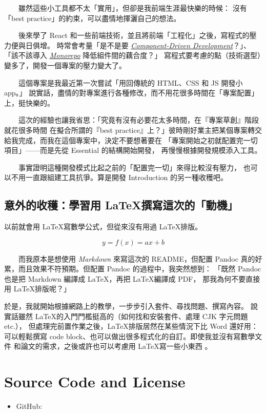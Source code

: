 \documentclass[12pt]{article}
\begin{document}
  　　雖然這些小工具都不太「實用」，但卻是我前端生涯最快樂的時候：
  沒有「best practice」的約束，可以盡情地揮灑自己的想法。

  　　後來學了 React 和一些前端技術，並且將前端「工程化」之後，寫程式的壓力便與日俱增。
  時常會考量「是不是要 \href{https://www.componentdriven.org}{\textit{Component-Driven Development}}？」、
  「該不該導入 \href{https://nx.dev}{\textit{Monorepo}} 降低組件間的藕合度？」
  寫程式要考慮的點（技術選型）變多了，開發一個專案的壓力變大了。

  　　這個專案是我最近第一次嘗試「用回傳統的 HTML、CSS 和 JS 開發小 app。」
  說實話，盡情的對專案進行各種修改，而不用花很多時間在「專案配置」上，挺快樂的。

  　　這次的經驗也讓我省思：「究竟有沒有必要花太多時間，在『專案草創』階段就花很多時間
  在擬合所謂的『best practice』上？」彼時剛好業主把某個專案轉交給我完成，而我在這個專案中，決定不要想著要在
  「專案開始之初就配置完一切項目」——而是先從 Essential 的結構開始開發，
  再慢慢根據開發規模添入工具。

  　　事實證明這種開發模式比起之前的「配置完一切」來得比較沒有壓力，
  也可以不用一直跟組建工具抗爭。算是開發 Introduction 的另一種收穫吧。

  \subsection{意外的收穫：學習用 \LaTeX 撰寫這次的「動機」}
  以前就會用 \LaTeX 寫數學公式，但從來沒有用過 \LaTeX 排版。

        $$y = f(x) = ax+b$$

  　　而我原本是想使用 \textit{Markdown} 來寫這次的 README，但配置
  Pandoc 真的好累，而且效果不符預期。但配置 Pandoc 的過程中，我突然想到：
  「既然 Pandoc 也是把 Markdown 編譯成 \LaTeX，再把 \LaTeX 編譯成 PDF，
  那我為何不要直接用 \LaTeX 排版呢？」

  於是，我就開始根據網路上的教學，一步步引入套件、尋找問題、撰寫內容。
  說實話雖然 \LaTeX 的入門門檻挺高的（如何找和安裝套件、處理 CJK 字元問題 etc.），
  但處理完前置作業之後，\LaTeX 排版居然在某些情況下比 Word 還好用：
  可以輕鬆撰寫 code block、也可以做出很多程式化的自訂。即使我並沒有寫數學文件
  和論文的需求，之後或許也可以考慮用 \LaTeX 寫一些小東西 。

  \section{Source Code and License}

  \begin{itemize}
    \item GitHub: \url{}
  \end{itemize}
\end{document}
